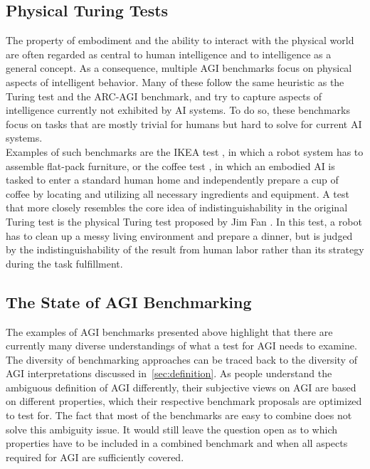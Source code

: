 \subsection{Physical Turing Tests}
The property of embodiment and the ability to interact with the physical world are often regarded as central to human intelligence and to intelligence as a general concept.
As a consequence, multiple AGI benchmarks focus on physical aspects of intelligent behavior.
Many of these follow the same heuristic as the Turing test and the ARC-AGI benchmark, and try to capture aspects of intelligence currently not exhibited by AI systems.
To do so, these benchmarks focus on tasks that are mostly trivial for humans but hard to solve for current AI systems.\\

Examples of such benchmarks are the IKEA test \citep{turk_plan_2015}, in which a robot system has to assemble flat-pack furniture, or the coffee test \citep{goertzel_architecture_2012}, in which an embodied AI is tasked to enter a standard human home and independently prepare a cup of coffee by locating and utilizing all necessary ingredients and equipment.
A test that more closely resembles the core idea of indistinguishability in the original Turing test is the physical Turing test proposed by Jim Fan \citep{sequoia_capital_physical_2025}.
In this test, a robot has to clean up a messy living environment and prepare a dinner, but is judged by the indistinguishability of the result from human labor rather than its strategy during the task fulfillment.

\subsection{The State of AGI Benchmarking}
The examples of AGI benchmarks presented above highlight that there are currently many diverse understandings of what a test for AGI needs to examine.
The diversity of benchmarking approaches can be traced back to the diversity of AGI interpretations discussed in~\cref{sec:definition}.
As people understand the ambiguous definition of AGI differently, their subjective views on AGI are based on different properties, which their respective benchmark proposals are optimized to test for.
The fact that most of the benchmarks are easy to combine does not solve this ambiguity issue.
It would still leave the question open as to which properties have to be included in a combined benchmark and when all aspects required for AGI are sufficiently covered.\\


